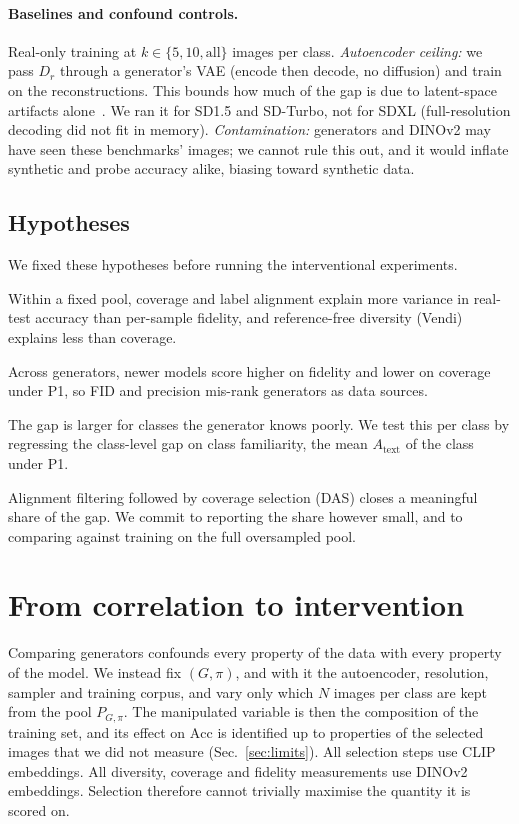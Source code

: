 \documentclass[10pt,twocolumn,letterpaper]{article}
\newcommand{\Atext}{A_{\text{text}}}
\begin{document}
\paragraph{Baselines and confound controls.} Real-only training at $k\in\{5,10,\text{all}\}$ images per class. \emph{Autoencoder ceiling:} we pass $D_r$ through a generator's VAE (encode then decode, no diffusion) and train on the reconstructions. This bounds how much of the gap is due to latent-space artifacts alone~\cite{adamkiewicz2026pretty}. We ran it for SD1.5 and SD-Turbo, not for SDXL (full-resolution decoding did not fit in memory). \emph{Contamination:} generators and DINOv2 may have seen these benchmarks' images; we cannot rule this out, and it would inflate synthetic and probe accuracy alike, biasing toward synthetic data.

\subsection{Hypotheses}\label{sec:hyp}
We fixed these hypotheses before running the interventional experiments.
\begin{description}\setlength{\itemsep}{1pt}
\item[H1.] Within a fixed pool, coverage and label alignment explain more variance in real-test accuracy than per-sample fidelity, and reference-free diversity (Vendi) explains less than coverage.
\item[H2.] Across generators, newer models score higher on fidelity and lower on coverage under P1, so FID and precision mis-rank generators as data sources.
\item[H3.] The gap is larger for classes the generator knows poorly. We test this per class by regressing the class-level gap on class familiarity, the mean $\Atext$ of the class under P1.
\item[H4.] Alignment filtering followed by coverage selection (DAS) closes a meaningful share of the gap. We commit to reporting the share however small, and to comparing against training on the full oversampled pool.
\end{description}

\section{From correlation to intervention}
Comparing generators confounds every property of the data with every property of the model. We instead fix $(G,\pi)$, and with it the autoencoder, resolution, sampler and training corpus, and vary only which $N$ images per class are kept from the pool $P_{G,\pi}$. The manipulated variable is then the composition of the training set, and its effect on $\text{Acc}$ is identified up to properties of the selected images that we did not measure (Sec.~\ref{sec:limits}). All selection steps use CLIP embeddings. All diversity, coverage and fidelity measurements use DINOv2 embeddings. Selection therefore cannot trivially maximise the quantity it is scored on.
\end{document}
